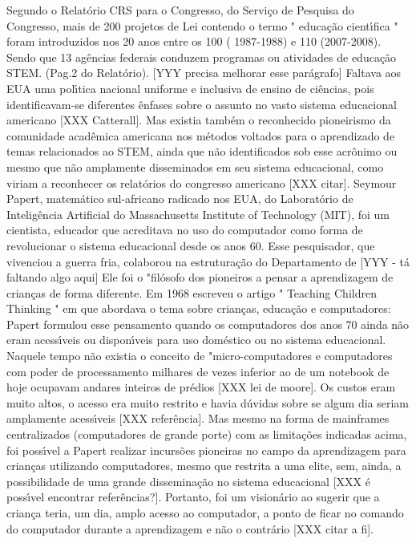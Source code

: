 \documentclass[
12pt,		%
openright,	%
twoside,  %
a4paper,			%
chapter=TITLE,		%
english,			%
french,				%
spanish,			%
brazil				%
]{USPSC-classe/USPSC}
\begin{document}
Segundo o Relat\'orio CRS para o Congresso, do Servi\c{c}o de Pesquisa do Congresso, mais de 200 projetos de Lei contendo o termo " educa\c{c}\~ao cient\'{\i}fica " foram introduzidos nos 20 anos entre os 100 ( 1987-1988) e 110 (2007-2008). Sendo que 13 ag\^encias federais conduzem programas ou atividades de educa\c{c}\~ao STEM. (Pag.2 do Relat\'orio). 
[YYY precisa melhorar esse par\'agrafo]
Faltava aos EUA uma pol\'{\i}tica nacional uniforme e inclusiva de ensino de ci\^encias, pois identificavam-se diferentes \^enfases sobre o assunto no vasto sistema educacional americano [XXX Catterall]. 
Mas existia tamb\'em o reconhecido pioneirismo da comunidade acad\^emica americana nos m\'etodos voltados para o aprendizado de temas relacionados ao STEM, ainda que n\~ao identificados sob esse acr\^onimo ou mesmo que n\~ao amplamente disseminados em seu sistema educacional, como viriam a reconhecer os relat\'orios do congresso americano [XXX citar]. 
Seymour Papert, matem\'atico sul-africano radicado nos EUA, do Laborat\'orio de Intelig\^encia Artificial do Massachusetts Institute of Technology (MIT), foi um  cientista, educador que acreditava  no  uso do computador como forma de revolucionar o sistema  educacional  desde os anos 60. Esse pesquisador, que vivenciou a guerra fria, colaborou na estrutura\c{c}\~ao do Departamento de  [YYY - t\'a faltando algo aqui]
Ele foi o "fil\'osofo dos pioneiros a pensar a aprendizagem de crian\c{c}as de forma diferente. Em 1968 escreveu o artigo " Teaching Children Thinking "  em que abordava  o tema sobre crian\c{c}as, educa\c{c}\~ao e computadores: 
Papert formulou esse pensamento quando os computadores dos anos 70 ainda n\~ao eram acess\'{\i}veis ou dispon\'{\i}veis para uso dom\'estico ou no sistema educacional. Naquele tempo n\~ao existia o conceito de "micro-computadores e computadores com poder de processamento milhares de vezes inferior ao de um notebook de hoje ocupavam andares inteiros de pr\'edios [XXX lei de moore]. Os custos eram muito altos, o acesso era muito restrito e havia d\'uvidas sobre se algum dia seriam amplamente acess\'{\i}veis [XXX refer\^encia]. Mas mesmo na forma de mainframes centralizados (computadores de grande porte) com as limita\c{c}\~oes indicadas acima, foi poss\'{\i}vel a Papert realizar incurs\~oes pioneiras no campo da aprendizagem para crian\c{c}as utilizando computadores, mesmo que restrita a uma elite, sem, ainda, a possibilidade de uma grande dissemina\c{c}\~ao no sistema educacional [XXX \'e poss\'{\i}vel encontrar refer\^encias?].  Portanto, foi um vision\'ario ao sugerir que a crian\c{c}a teria, um dia, amplo acesso ao computador, a ponto de ficar no comando do computador durante a aprendizagem e n\~ao o contr\'ario [XXX citar a fi]. 
\end{document}
